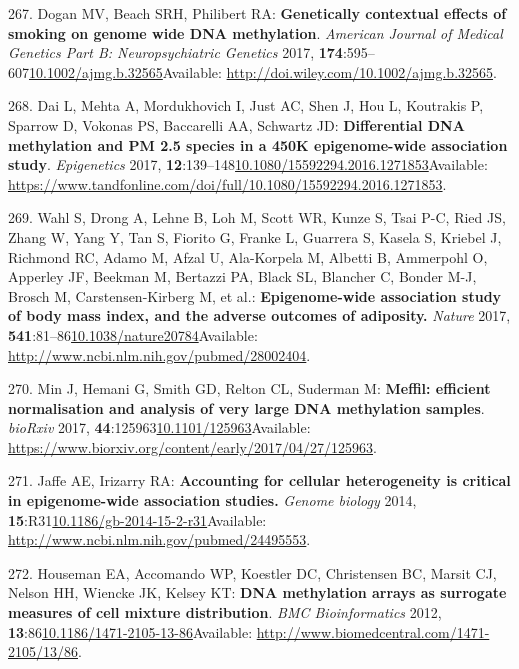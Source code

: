 \documentclass[
]{book}
\begin{document}
\leavevmode\hypertarget{ref-Dogan2017}{}%
267. Dogan MV, Beach SRH, Philibert RA: \textbf{Genetically contextual effects of smoking on genome wide DNA methylation}. \emph{American Journal of Medical Genetics Part B: Neuropsychiatric Genetics} 2017, \textbf{174}:595--607\href{https://doi.org/10.1002/ajmg.b.32565}{10.1002/ajmg.b.32565}Available: \url{http://doi.wiley.com/10.1002/ajmg.b.32565}.

\leavevmode\hypertarget{ref-Dai2016}{}%
268. Dai L, Mehta A, Mordukhovich I, Just AC, Shen J, Hou L, Koutrakis P, Sparrow D, Vokonas PS, Baccarelli AA, Schwartz JD: \textbf{Differential DNA methylation and PM 2.5 species in a 450K epigenome-wide association study}. \emph{Epigenetics} 2017, \textbf{12}:139--148\href{https://doi.org/10.1080/15592294.2016.1271853}{10.1080/15592294.2016.1271853}Available: \url{https://www.tandfonline.com/doi/full/10.1080/15592294.2016.1271853}.

\leavevmode\hypertarget{ref-Wahl2016}{}%
269. Wahl S, Drong A, Lehne B, Loh M, Scott WR, Kunze S, Tsai P-C, Ried JS, Zhang W, Yang Y, Tan S, Fiorito G, Franke L, Guarrera S, Kasela S, Kriebel J, Richmond RC, Adamo M, Afzal U, Ala-Korpela M, Albetti B, Ammerpohl O, Apperley JF, Beekman M, Bertazzi PA, Black SL, Blancher C, Bonder M-J, Brosch M, Carstensen-Kirberg M, et al.: \textbf{Epigenome-wide association study of body mass index, and the adverse outcomes of adiposity.} \emph{Nature} 2017, \textbf{541}:81--86\href{https://doi.org/10.1038/nature20784}{10.1038/nature20784}Available: \url{http://www.ncbi.nlm.nih.gov/pubmed/28002404}.

\leavevmode\hypertarget{ref-Min2017}{}%
270. Min J, Hemani G, Smith GD, Relton CL, Suderman M: \textbf{Meffil: efficient normalisation and analysis of very large DNA methylation samples}. \emph{bioRxiv} 2017, \textbf{44}:125963\href{https://doi.org/10.1101/125963}{10.1101/125963}Available: \url{https://www.biorxiv.org/content/early/2017/04/27/125963}.

\leavevmode\hypertarget{ref-Jaffe2014}{}%
271. Jaffe AE, Irizarry RA: \textbf{Accounting for cellular heterogeneity is critical in epigenome-wide association studies.} \emph{Genome biology} 2014, \textbf{15}:R31\href{https://doi.org/10.1186/gb-2014-15-2-r31}{10.1186/gb-2014-15-2-r31}Available: \url{http://www.ncbi.nlm.nih.gov/pubmed/24495553}.

\leavevmode\hypertarget{ref-Houseman2012}{}%
272. Houseman EA, Accomando WP, Koestler DC, Christensen BC, Marsit CJ, Nelson HH, Wiencke JK, Kelsey KT: \textbf{DNA methylation arrays as surrogate measures of cell mixture distribution}. \emph{BMC Bioinformatics} 2012, \textbf{13}:86\href{https://doi.org/10.1186/1471-2105-13-86}{10.1186/1471-2105-13-86}Available: \url{http://www.biomedcentral.com/1471-2105/13/86}.
\end{document}
